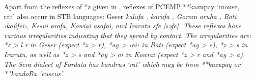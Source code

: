 Apart from the reflexes of *z given in ,
reflexes of PCEMP **kazupay ‘mouse,
rat’ also occur in STB languages: Geser \it{kalufa} \citep[144]{Collins1986},
\it{karufa} \citep{Stokhof1982b}, Gorom \it{aruha} \citep{Visser2019a},
Bati ‹kaúfei›, Kesui \it{arofa,} Kowiai \it{asafai},
and Irarutu \it{sfe} [səfe].
These reflexes have various irregularities indicating that they spread by contact.
The irregularities are: *z > \it{l {\tl} r} in Geser (expect
*z > \it{r}), *ay > ‹ei› in Bati (expect *ay > \it{e}),
*z > s in Irarutu,
as well as *z > \it{s}
and *ay > \it{ai} in Kowiai (expect *z > \it{r}
and *ay > \it{a}).
The Sera dialect of Fordata has \it{kandruə} ‘rat’ which may
be from **kazupay or **kandoRa ‘cuscus’.

